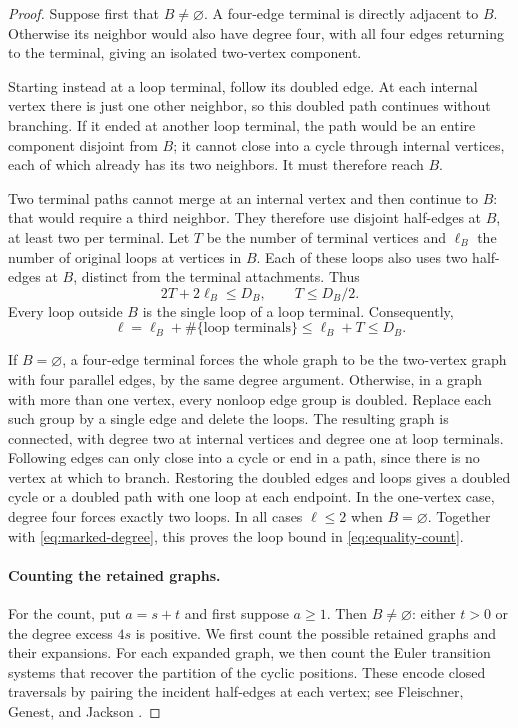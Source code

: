 \documentclass[11pt]{article}
\theoremstyle{definition}
\theoremstyle{remark}
\theoremstyle{plain}
\begin{document}
\begin{proof}
Suppose first that \(B\ne\varnothing\). A four-edge terminal is directly adjacent
to \(B\). Otherwise its neighbor would also have degree four,
with all four edges returning to the terminal, giving an isolated
two-vertex component.

Starting instead at a loop terminal, follow
its doubled edge. At each internal vertex there is just one other
neighbor, so this doubled path continues without branching. If it
ended at another loop terminal, the path would be an entire
component disjoint from $B$; it cannot close into a cycle through
internal vertices, each of which already has its two neighbors.
It must therefore reach $B$.

Two terminal paths cannot merge at an internal vertex and then
continue to $B$: that would require a third neighbor. They therefore
use disjoint half-edges at $B$, at least two per terminal. Let $T$
be the number of terminal vertices and $\ell_B$ the number of
original loops at vertices in $B$. Each of these loops also uses
two half-edges at $B$, distinct from the terminal attachments. Thus
\[
 2T+2\ell_B\le D_B,\qquad T\le D_B/2.
\]
Every loop outside $B$ is the single loop of a loop terminal.
Consequently,
\[
 \ell=\ell_B+\#\{\text{loop terminals}\}
 \le\ell_B+T\le D_B.
\]

If \(B=\varnothing\), a four-edge terminal forces the whole graph
to be the two-vertex graph with four parallel edges, by the same
degree argument. Otherwise, in a graph with more than one vertex,
every nonloop edge group is doubled. Replace each such group by a
single edge and delete the loops. The resulting graph is connected,
with degree two at internal vertices and degree one at loop terminals.
Following edges can only close into a cycle or end in a path, since
there is no vertex at which to branch. Restoring the doubled edges
and loops gives a doubled cycle or a doubled path with one loop at
each endpoint. In the one-vertex case, degree four forces exactly
two loops. In all cases $\ell\le2$ when $B=\varnothing$.
Together with \eqref{eq:marked-degree}, this proves
the loop bound in \eqref{eq:equality-count}.

\paragraph{Counting the retained graphs.}
For the count, put $a=s+t$ and first suppose $a\ge1$.
Then $B\ne\varnothing$: either $t>0$ or the degree excess $4s$
is positive.
We first count the possible retained graphs and their expansions.
For each expanded graph, we then count the Euler transition systems
that recover the partition of the cyclic positions. These encode
closed traversals by pairing the incident half-edges at each vertex;
see Fleischner, Genest, and Jackson
\cite[Section~1]{fleischner_genest_jackson}.


\end{proof}
\end{document}

